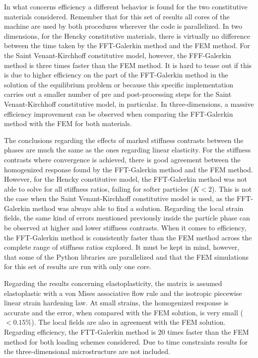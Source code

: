 In what concerns efficiency a different behavior is found for the two constitutive materials considered.
Remember that for this set of results all cores of the machine are used by both procedures wherever the code is parallelized.
In two dimensions, for the Hencky constitutive materials, there is virtually no difference between the time taken by the FFT-Galerkin method and the FEM method.
For the Saint Venant-Kirchhoff constitutive model, however, the FFF-Galerkin method is three times faster than the FEM method.
It is hard to tease out if this is due to higher efficiency on the part of the FFT-Galerkin method in the solution of the equilibrium problem or because this specific implementation carries out a smaller number of pre and post-processing steps for the Saint Venant-Kirchhoff constitutive model, in particular.
In three-dimensions, a massive efficiency improvement can be observed when comparing the FFT-Galerkin method with the FEM for both materials.

The conclusions regarding the effects of marked stiffness contrasts between the phases are much the same as the ones regarding linear elasticity.
For the stiffness contrasts where convergence is achieved, there is good agreement between the homogenized response found by the FFT-Galerkin method and the FEM method.
However,  for the Hencky constitutive model, the FFT-Galerkin method was not able to solve for all stiffness ratios, failing for softer particles (\(K<2\)).
This is not the case when the Saint Venant-Kirchhoff constitutive model is used, as the FFT-Galerkin method was always able to find a solution.
Regarding the local strain fields, the same kind of errors mentioned previously inside the particle phase can be observed at higher and lower stiffness contrasts.
When it comes to efficiency, the FFT-Galerkin method is consistently faster than the FEM method across the complete range of stiffness ratios explored.
It must be kept in mind, however, that some of the Python libraries are parallelized and that the FEM simulations for this set of results are run with only one core.

Regarding the results concerning elastoplasticity, the matrix is assumed elastoplastic with a von Mises associative flow rule and the isotropic piecewise linear strain hardening law.
At small strains, the homogenized response is accurate and the error, when compared with the FEM solution, is very small (\(<0.15\%\)).
The local fields are also in agreement with the FEM solution.
Regarding efficiency, the FTT-Galerkin method is 20 times faster than the FEM method for both loading schemes considered.
Due to time constraints results for the three-dimensional microstructure are not included.

